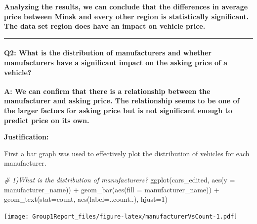 \documentclass[
]{article}
\newenvironment{Shaded}{\begin{snugshade}}{\end{snugshade}}
\newcommand{\AttributeTok}[1]{\textcolor[rgb]{0.77,0.63,0.00}{#1}}
\newcommand{\CommentTok}[1]{\textcolor[rgb]{0.56,0.35,0.01}{\textit{#1}}}
\newcommand{\DecValTok}[1]{\textcolor[rgb]{0.00,0.00,0.81}{#1}}
\newcommand{\FunctionTok}[1]{\textcolor[rgb]{0.00,0.00,0.00}{#1}}
\newcommand{\NormalTok}[1]{#1}
\newcommand{\SpecialCharTok}[1]{\textcolor[rgb]{0.00,0.00,0.00}{#1}}
\newcommand{\StringTok}[1]{\textcolor[rgb]{0.31,0.60,0.02}{#1}}
\begin{document}
\textbf{Analyzing the results, we can conclude that the differences in
average price between Minsk and every other region is statistically
significant. The data set region does have an impact on vehicle price.}

\begin{center}\rule{0.5\linewidth}{0.5pt}\end{center}

\hypertarget{q2-what-is-the-distribution-of-manufacturers-and-whether-manufacturers-have-a-significant-impact-on-the-asking-price-of-a-vehicle}{%
\paragraph{\texorpdfstring{\textbf{Q2:} What is the distribution of
manufacturers and whether manufacturers have a significant impact on the
asking price of a
vehicle?}{Q2: What is the distribution of manufacturers and whether manufacturers have a significant impact on the asking price of a vehicle?}}\label{q2-what-is-the-distribution-of-manufacturers-and-whether-manufacturers-have-a-significant-impact-on-the-asking-price-of-a-vehicle}}

\textbf{A: We can confirm that there is a relationship between the
manufacturer and asking price. The relationship seems to be one of the
larger factors for asking price but is not significant enough to predict
price on its own.}

\textbf{Justification:}

First a bar graph was used to effectively plot the distribution of
vehicles for each manufacturer.

\begin{Shaded}
\begin{Highlighting}[]
\CommentTok{\# 1)What is the distribution of manufacturers?}
\FunctionTok{ggplot}\NormalTok{(cars\_edited, }\FunctionTok{aes}\NormalTok{(}\AttributeTok{y =}\NormalTok{ manufacturer\_name)) }\SpecialCharTok{+} \FunctionTok{geom\_bar}\NormalTok{(}\FunctionTok{aes}\NormalTok{(}\AttributeTok{fill =}\NormalTok{ manufacturer\_name)) }\SpecialCharTok{+} \FunctionTok{geom\_text}\NormalTok{(}\AttributeTok{stat=}\StringTok{\textquotesingle{}count\textquotesingle{}}\NormalTok{, }\FunctionTok{aes}\NormalTok{(}\AttributeTok{label=}\NormalTok{..count..), }\AttributeTok{hjust=}\DecValTok{1}\NormalTok{)}
\end{Highlighting}
\end{Shaded}

\texttt{[image: Group1Report\_files/figure-latex/manufacturerVsCount-1.pdf]}
\end{document}
